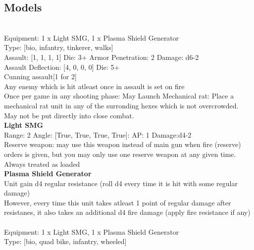 \subsection{ Models }

 \\
Equipment: 1 x Light SMG, 1 x Plasma Shield Generator \\
Type: [bio, infantry, tinkerer, walks] \\

Assault: [1, 1, 1, 1] Die: 3+ Armor Penetration: 2 Damage: d6-2 \\
Assault Deflection: [4, 0, 0, 0] Die: 5+\\
\indent Cunning assault[1 for 2]\\ 
Any enemy which is hit atleast once in assault is set on fire\\ 
 

Once per game in any shooting phase: May Launch Mechanical rat: Place a mechanical rat unit in any of the surronding hexes which is not overcrowded. May not be put directly into close combat. \\ 


{\bf Light SMG } \\



Range: 2  Angle: [True, True, True, True]: AP: 1 Damage:d4-2 \\
Reserve weapon: may use this weapon instead of main gun when fire (reserve) orders is given, but you may only use one reserve weapon at any given time.\\ 
Always treated as loaded\\ 




{\bf Plasma Shield Generator } \\

Unit gain d4 regular resistance (roll d4 every time it is hit with some regular damage)\\ 
However, every time this unit takes atleast 1 point of regular damage after resistanes, it also takes an additional d4 fire damage (apply fire resistance if any)\\ 





 



 \\
Equipment: 1 x Light SMG, 1 x Plasma Shield Generator \\
Type: [bio, quad bike, infantry, wheeled] \\

